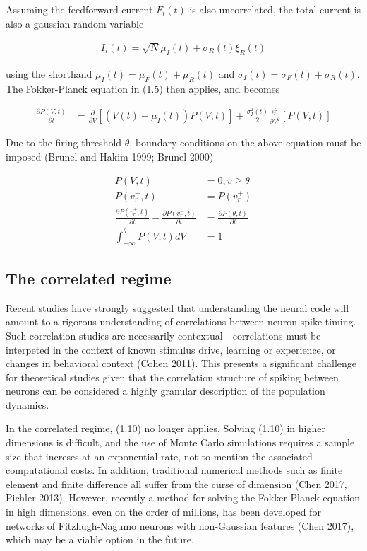 \documentclass{ucetd}
\begin{document}
Assuming the feedforward current $F_{i}(t)$ is also uncorrelated, the total current is also a gaussian random variable 

\begin{align*}
I_{i}(t) = \sqrt{N}\mu_{I}(t) + \sigma_{R}(t)\xi_{R}(t)
\end{align*}


using the shorthand $\mu_{I}(t) = \mu_{F}(t) + \mu_{R}(t)$ and $\sigma_{I}(t) = \sigma_{F}(t) + \sigma_{R}(t)$. The Fokker-Planck equation in (1.5) then applies, and becomes

\begin{align}
\frac{\partial P(V,t)}{\partial t} &= \frac{\partial}{\partial V}[\left(V(t)-\mu_{I}(t)\right) P(V,t)] + \frac{\sigma_{I}^{2}(t)}{2}\frac{\partial^{2}}{\partial V^{2}}[P(V,t)]
\end{align}

Due to the firing threshold $\theta$, boundary conditions on the above equation must be imposed (Brunel and Hakim 1999; Brunel 2000)

\begin{align*}
P(V,t) &= 0, v\geq \theta\\
P(v_{r}^{-},t) &= P(v_{r}^{+})\\
\frac{\partial P(v_{r}^{+},t)}{\partial t}-\frac{\partial P(v_{r}^{-},t)}{\partial t} &= \frac{\partial P(\theta,t)}{\partial t}\\
\int_{-\infty}^{\theta} P(V,t)dV &= 1
\end{align*}


\subsection{The correlated regime}

Recent studies have strongly suggested that understanding the neural code will amount to a rigorous understanding of correlations between neuron spike-timing. Such correlation studies are necessarily contextual - correlations must be interpeted in the context of known stimulus drive, learning or experience, or changes in behavioral context (Cohen 2011). This presents a significant challenge for theoretical studies given that the correlation structure of spiking between neurons can be considered a highly granular description of the population dynamics.

In the correlated regime, (1.10) no longer applies. Solving (1.10) in higher dimensions is difficult, and the use of Monte Carlo simulations requires a sample size that increses at an exponential rate, not to mention the associated computational costs. In addition, traditional numerical methods such as finite element and finite difference all suffer from the curse of dimension (Chen 2017, Pichler 2013). However, recently a method for solving the Fokker-Planck equation in high dimensions, even on the order of millions, has been developed for networks of Fitzhugh-Nagumo neurons with non-Gaussian features (Chen 2017), which may be a viable option in the future.
\end{document}

